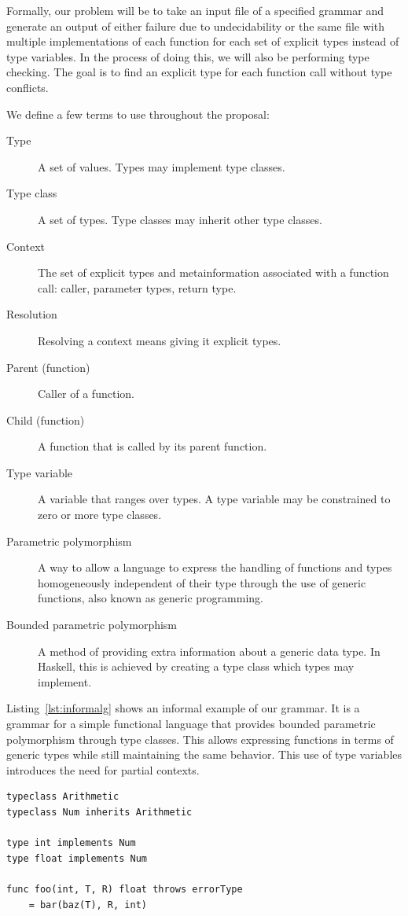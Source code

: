 \documentclass{acm_proc_article-sp}
\begin{document}
Formally, our problem will be to take an input file of a specified grammar and
generate an output of either failure due to undecidability or the same file
with multiple implementations of each function for each set of explicit types
instead of type variables. In the process of doing this, we will also be
performing type checking. The goal is to find an explicit type for
each function call without type conflicts.

We define a few terms to use throughout the proposal:
\begin{description}
	\item[Type] A set of values. Types may implement type classes.
	\item[Type class] A set of types. Type classes may inherit other type classes.
	\item[Context] The set of explicit types and metainformation associated
		with a function call: caller, parameter types, return type.
	\item[Resolution] Resolving a context means giving it explicit types.
	\item[Parent (function)] Caller of a function.
	\item[Child (function)] A function that is called by its parent function.
	\item[Type variable] A variable that ranges over types. A type variable may
		be constrained to zero or more type classes.
	\item[Parametric polymorphism] A way to allow a language to express the
		handling of functions and types homogeneously independent of their type
		through the use of generic functions, also known as generic
		programming.
	\item[Bounded parametric polymorphism] A method of providing extra
		information about a generic data type. In Haskell, this is achieved by
		creating a type class which types may implement.
\end{description}

Listing~\ref{lst:informalg} shows an informal example of our grammar. It is a
grammar for a simple functional language that provides bounded parametric
polymorphism through type classes. This allows expressing functions in terms of
generic types while still maintaining the same behavior. This use of type
variables introduces the need for partial contexts.

\begin{lstlisting}[caption=Grammar displayed informally,language=Paratype,label=lst:informalg]
typeclass Arithmetic
typeclass Num inherits Arithmetic

type int implements Num
type float implements Num

func foo(int, T, R) float throws errorType
    = bar(baz(T), R, int)
\end{lstlisting}
\end{document}
